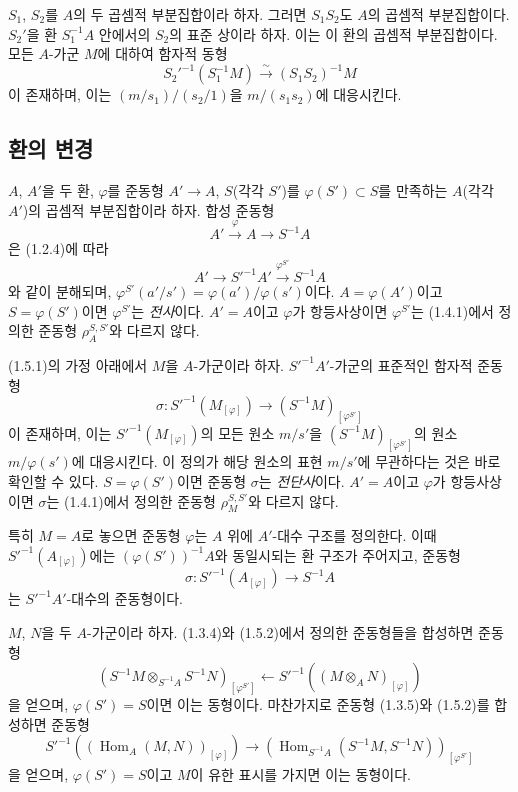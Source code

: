 \begin{env}[1.4.6]
\label{0.1.4.6-ko}
$S_1$, $S_2$를 $A$의 두 곱셈적 부분집합이라 하자. 그러면 $S_1S_2$도 $A$의 곱셈적 부분집합이다.
$S_2'$을 환 $S_1^{-1}A$ 안에서의 $S_2$의 표준 상이라 하자. 이는 이 환의 곱셈적 부분집합이다.
모든 $A$-가군 $M$에 대하여 함자적 동형
\[
  S_2'^{-1}(S_1^{-1}M)\xrightarrow{\sim}(S_1S_2)^{-1}M
\]
이 존재하며, 이는 $(m/s_1)/(s_2/1)$을 $m/(s_1s_2)$에 대응시킨다.
\end{env}

\subsection{환의 변경}
\label{subsection:0.1.5-ko}

\begin{env}[1.5.1]
\label{0.1.5.1-ko}
$A$, $A'$을 두 환, $\varphi$를 준동형 $A'\to A$, $S$(각각 $S'$)를 $\varphi(S')\subset S$를 만족하는 $A$(각각 $A'$)의 곱셈적 부분집합이라 하자. 합성 준동형
\[
  A'\xrightarrow{\varphi}A\longrightarrow S^{-1}A
\]
은 (1.2.4)에 따라
\[
  A'\longrightarrow S'^{-1}A'\xrightarrow{\varphi^{S'}}S^{-1}A
\]
와 같이 분해되며, $\varphi^{S'}(a'/s')=\varphi(a')/\varphi(s')$이다.
$A=\varphi(A')$이고 $S=\varphi(S')$이면 $\varphi^{S'}$는 \emph{전사}이다.
$A'=A$이고 $\varphi$가 항등사상이면 $\varphi^{S'}$는 (1.4.1)에서 정의한 준동형 $\rho_A^{S,S'}$와 다르지 않다.
\end{env}

\begin{env}[1.5.2]
\label{0.1.5.2-ko}
(1.5.1)의 가정 아래에서 $M$을 $A$-가군이라 하자.
$S'^{-1}A'$-가군의 표준적인 함자적 준동형
\[
  \sigma:S'^{-1}(M_{[\varphi]})\longrightarrow
  (S^{-1}M)_{[\varphi^{S'}]}
\]
이 존재하며, 이는 $S'^{-1}(M_{[\varphi]})$의 모든 원소 $m/s'$을 $(S^{-1}M)_{[\varphi^{S'}]}$의 원소 $m/\varphi(s')$에 대응시킨다. 이 정의가 해당 원소의 표현 $m/s'$에 무관하다는 것은 바로 확인할 수 있다.
$S=\varphi(S')$이면 준동형 $\sigma$는 \emph{전단사}이다.
$A'=A$이고 $\varphi$가 항등사상이면 $\sigma$는 (1.4.1)에서 정의한 준동형 $\rho_M^{S,S'}$와 다르지 않다.

특히 $M=A$로 놓으면 준동형 $\varphi$는 $A$ 위에 $A'$-대수 구조를 정의한다. 이때 $S'^{-1}(A_{[\varphi]})$에는 $(\varphi(S'))^{-1}A$와 동일시되는 환 구조가 주어지고, 준동형
\[
  \sigma:S'^{-1}(A_{[\varphi]})\longrightarrow S^{-1}A
\]
는 $S'^{-1}A'$-대수의 준동형이다.
\end{env}

\begin{env}[1.5.3]
\label{0.1.5.3-ko}
$M$, $N$을 두 $A$-가군이라 하자. (1.3.4)와 (1.5.2)에서 정의한 준동형들을 합성하면 준동형
\[
  (S^{-1}M\otimes_{S^{-1}A}S^{-1}N)_{[\varphi^{S'}]}
  \longleftarrow
  S'^{-1}((M\otimes_A N)_{[\varphi]})
\]
을 얻으며, $\varphi(S')=S$이면 이는 동형이다.
마찬가지로 준동형 (1.3.5)와 (1.5.2)를 합성하면 준동형
\[
  S'^{-1}((\operatorname{Hom}_A(M,N))_{[\varphi]})
  \longrightarrow
  (\operatorname{Hom}_{S^{-1}A}(S^{-1}M,S^{-1}N))_{[\varphi^{S'}]}
\]
을 얻으며, $\varphi(S')=S$이고 $M$이 유한 표시를 가지면 이는 동형이다.
\end{env}

